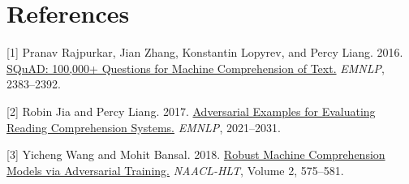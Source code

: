 \documentclass[11pt,letterpaper]{article}
\begin{document}
\vspace{-3pt}
\section*{References}
\small
[1] Pranav Rajpurkar, Jian Zhang, Konstantin Lopyrev, and Percy Liang. 2016.
\href{https://aclanthology.org/D16-1264/}{SQuAD: 100,000+ Questions for Machine Comprehension of Text.}
\emph{EMNLP}, 2383--2392.

[2] Robin Jia and Percy Liang. 2017.
\href{https://aclanthology.org/D17-1215/}{Adversarial Examples for Evaluating Reading Comprehension Systems.}
\emph{EMNLP}, 2021--2031.

[3] Yicheng Wang and Mohit Bansal. 2018.
\href{https://aclanthology.org/N18-2091/}{Robust Machine Comprehension Models via Adversarial Training.}
\emph{NAACL-HLT}, Volume 2, 575--581.
\end{document}
